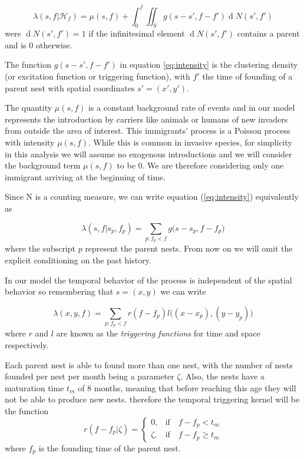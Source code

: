 \documentclass{article}
\renewcommand{\d}[1]{\ensuremath{\operatorname{d}\!{#1}}}
\begin{document}
\begin{equation}\label{eq:intensity}
    \lambda(s, f | \mathcal{H}_f) = \mu(s, f) + \int_{0}^{f} \iint_{S} g(s - s', f - f') \d N(s', f')
\end{equation}
were $\d N(s', f') = 1$ if the infinitesimal element $\d N(s', f')$ contains a parent and is 0 otherwise. 

The function $g(s - s', f - f')$ in equation \ref{eq:intensity} is the clustering density (or excitation function or triggering function), with $f'$ the time of founding of a parent nest with spatial coordinates $s' = (x', y')$.

The quantity $\mu(s, f)$ is a constant background rate of events and in our model represents the introduction by carriers like animals or humans of new invaders from outside the area of interest. This immigrants' process is a Poisson process with intensity $\mu(s, f)$. While this is common in invasive species, for simplicity in this analysis we will assume no exogenous introductions and we will consider the background term $\mu(s, f) $ to be 0. We are therefore considering only one immigrant arriving at the beginning of time. 

Since N is a counting measure, we can write equation (\ref{eq:intensity}) equivalently as

\begin{equation*}
    \lambda(s, f | s_p, f_p) = \sum_{ p: f_p < f } g \Big(s - s_p, f - f_p \Big)
\end{equation*}
where the subscript $p$ represent the parent nests. From now on we will omit the explicit conditioning on the past history.

In our model the temporal behavior of the process is independent of the spatial behavior so remembering that $s = (x, y)$ we can write

\begin{equation*}
    \lambda(x, y, f) = \sum_{ p: f_p < f } r(f-f_p) l\Big((x - x_p), (y - y_p)\Big)
\end{equation*}
where $r$ and $l$ are known as the {\em triggering functions} for time and space respectively.

Each parent nest is able to found more than one nest, with the number of nests founded per nest per month being a parameter $\zeta$. Also, the nests have a maturation time $t_m$ of 8 months, meaning that before reaching this age they will not be able to produce new nests. therefore the temporal triggering kernel will be the function
\begin{equation*}
    r (f - f_p | \zeta) =
    \begin{cases}
        0, & \mbox{if} \quad f - f_p < t_{m} \\
        \zeta, & \mbox{if} \quad f - f_p \geq t_{m}
    \end{cases}
\end{equation*}
where $f_p$ is the founding time of the parent nest.
\end{document}
